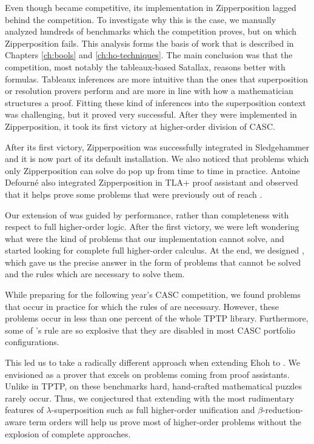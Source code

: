 Even though \lsup{} became competitive, its implementation in Zipperposition
lagged behind the competition. To investigate why this is the case,
we manually analyzed hundreds of benchmarks which the competition proves, but
on which Zipperposition fails. This analysis forms the basis of work that is
described in Chapters \ref{ch:bools} and \ref{ch:ho-techniques}. The main
conclusion was that the competition, most notably the tableaux-based Satallax,
reasons better with formulas. Tableaux inferences are more intuitive than the
ones that superposition or resolution provers perform and are more in line with
how a mathematician structures a proof. Fitting these kind of
inferences into the superposition context was challenging, but it proved very
successful. After they were implemented in Zipperposition, it took its first
victory at higher-order division of CASC.

After its first victory, Zipperposition was successfully integrated in
Sledgehammer and it is now part of its default installation. We also noticed
that problems which only Zipperposition can solve do pop up from time to time in
practice. Antoine Defourné also integrated Zipperposition in TLA+ proof
assistant and observed that it helps prove some problems that were previously
out of reach \cite{ad-21-ho-tlaplus}.

Our extension of \lsup{} was guided by performance, rather than completeness
with respect to full higher-order logic. After the first victory, we were left
wondering what were the kind of problems that our implementation cannot
solve, and started looking for complete full higher-order calculus. At the end,
we designed \osup{}, which gave us the precise answer in the form of problems that
cannot be solved and the rules which are necessary to solve them. 

While preparing for the following year's CASC competition, we found problems
that occur in practice for which the rules of \osup{} are necessary. However,
these problems occur in less than one percent of the whole TPTP library.
Furthermore, some of \osup{}'s rule are so explosive that they are disabled in
most CASC portfolio configurations.

This led us to take a radically different approach when extending Ehoh to
\ehohii{}. We envisioned \ehohii{} as a prover that excels on problems coming
from proof assistants. Unlike in TPTP, on these benchmarks hard, hand-crafted mathematical puzzles rarely occur.
Thus, we conjectured that extending \lfsup{} with the most rudimentary features
of $\lambda$-superposition such as full higher-order unification and
$\beta$-reduction-aware term orders will help us prove most of higher-order
problems without the explosion of complete approaches.

